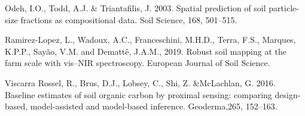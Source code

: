 \documentclass[]{book}
\newenvironment{Shaded}{\begin{snugshade}}{\end{snugshade}}
\newcommand{\DataTypeTok}[1]{\textcolor[rgb]{0.13,0.29,0.53}{#1}}
\newcommand{\KeywordTok}[1]{\textcolor[rgb]{0.13,0.29,0.53}{\textbf{#1}}}
\newcommand{\NormalTok}[1]{#1}
\newcommand{\OperatorTok}[1]{\textcolor[rgb]{0.81,0.36,0.00}{\textbf{#1}}}
\newcommand{\StringTok}[1]{\textcolor[rgb]{0.31,0.60,0.02}{#1}}
\begin{document}
\begin{Shaded}
\end{Shaded}

Odeh, I.O., Todd, A.J. \& Triantafilis, J. 2003. Spatial prediction of soil particle-size fractions as compositional data. Soil Science, 168, 501--515.

Ramirez-Lopez, L., Wadoux, A.C., Franceschini, M.H.D., Terra, F.S., Marques, K.P.P., Sayão, V.M. and Demattê, J.A.M., 2019. Robust soil mapping at the farm scale with vis--NIR spectroscopy. European Journal of Soil Science.

Viscarra Rossel, R., Brus, D.J., Lobsey, C., Shi, Z. \&McLachlan, G. 2016. Baseline estimates of soil organic carbon by proximal sensing: comparing design-based, model-assisted and model-based inference. Geoderma,265, 152--163.
\end{document}

